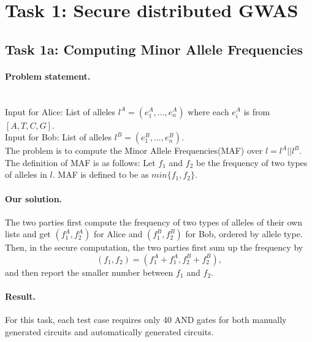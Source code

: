 \section{Task 1: Secure distributed GWAS}
\subsection*{Task 1a: Computing Minor Allele Frequencies}
\paragraph{Problem statement.}
~\\
Input for Alice: List of alleles $l^A = (e^A_1,...,e^A_n)$ where each $e^A_i$ is from $[A, T, C, G]$.\\
Input for Bob: List of alleles $l^B = (e^B_1,...,e^B_n)$.\\

The problem is to compute the 
Minor Allele Frequencies(MAF) over $l = l^A || l^B$. The definition of MAF is as follows:
Let $f_1$ and $f_2$ be the frequency of two types of alleles in $l$. MAF is defined to be as $min\{f_1, f_2\}$.

\paragraph{Our solution.}
The two parties first compute the frequency of two types of alleles of their own lists and get
$(f^A_1, f^A_2)$ for Alice and $(f^B_1,f^B_2)$ for Bob, ordered by allele type.
Then, in the secure computation, the two parties first sum up the frequency by
$$(f_1, f_2) = (f^A_1+f^A_1, f^B_2+f^B_2),$$
and then report the smaller number between $f_1$ and $f_2$.
\paragraph{Result.}
For this task, each test case requires only 40 AND gates for both manually generated circuits and automatically generated circuits.

